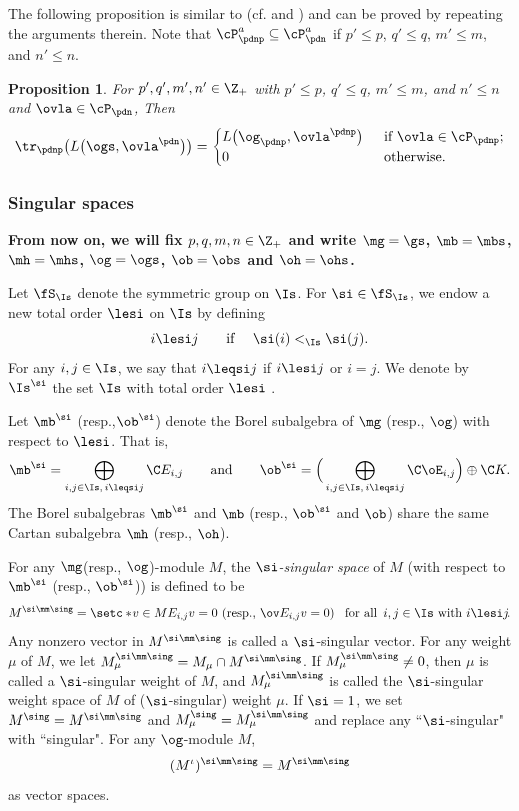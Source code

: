 \documentclass[11pt, reqno]{amsart}
\newtheorem{prop}[thm]{Proposition}
\theoremstyle{definition}
\theoremstyle{remark}
\numberwithin{equation}{section}
\begin{document}
The following proposition is similar to \cite[Lemma 3.2]{CLW11} (cf. \cite[Proposition 6.9]{CW} and \cite[Proposition 7.5]{CLW15}) and can be proved by repeating the arguments therein. Note that $\cP_\pdnp^a\subseteq \cP_\pdn^a$ if  $p' \le p$, $q' \le q$, $m' \le m$, and $n' \le n$.

\begin{prop}\label{trun-sep}
For $p', q', m', n' \in \Z_+$ with $p' \le p$, $q' \le q$, $m' \le m$, and $n' \le n$ and $\ovla \in \cP_\pdn$,
Then
$$
 \tr_\pdnp \big(L \big(\ogs, \ovla^\pdn \big)\big)
=\begin{cases}
     L \big(\og_\pdnp, \ovla^\pdnp \big) &\,\,\, \mbox{if $\ovla\in \cP_\pdnp$};\\
       0                                                   &\,\,\,  \mbox{otherwise}.
     \end{cases}
$$
\end{prop}


\subsubsection{Singular spaces}
 {\bf From now on, we will fix $p, q, m, n \in \Z_+$ and write $\mg=\gs$, $\mb=\mbs$, $\mh=\mhs$, $\og=\ogs$, $\ob=\obs$  and $\oh=\ohs$.}

Let $\fS_\Is$ denote the symmetric group on $\Is$.
For $\si \in  \fS_\Is$, we endow a new total order $\lesi$ on $\Is$ by defining
\begin{equation} \label{order}
i \lesi j \qquad \mbox{if $\quad \si(i)<_\Is \si(j)$.}
\end{equation}
For any $i, j \in \Is$, we say that $i \leqsi j$ if $i \lesi j$ or $i=j$.
We denote by $\Is^\si$ the set $\Is$ with total order $\lesi$ .

Let $\mb^{\si}$ (resp.,$\ob^{\si}$) denote the Borel subalgebra of $\mg$ (resp., $\og$) with respect to $\lesi$. That is,
$$
\mb^{\si}=\bigoplus_{\substack{ i,j \in \Is, \, i \leqsi j} }  \C E_{i, j}\qquad
\text{and} \qquad \ob^{\si}=\Big( \bigoplus_{\substack{ i,j \in \Is, \, i \leqsi j}} \C \oE_{i, j} \Big) \oplus \C K.
$$
The Borel subalgebras $\mb^{\si}$ and $\mb$ (resp., $\ob^{\si}$ and $\ob$) share the same Cartan subalgebra $\mh$ (resp., $\oh$).

For any $\mg$(resp., $\og$)-module $M$, the \emph{$\si$-singular space} of $M$ (with respect to $\mb^\si$ (resp., $\ob^\si$)) is defined to be
$$
M^{\si\mm\sing}=\setc*{\! v \in M }{E_{i, j} v=0 \,\,  \mbox{(resp., $\ov E_{i,j} v=0$) \, for all\, $i, j \in \Is $ with $i\lesi j$}\!}.
$$
Any nonzero vector in $M^{\si\mm\sing}$ is called a $\si$-singular vector.
For any weight $\mu$ of $M$, we let $M^{\si\mm\sing}_\mu=M_\mu \cap M^{\si\mm\sing}$.
If $M^{\si\mm\sing}_\mu \not=0$, then $\mu$ is called a $\si$-singular weight of $M$, and $M^{\si\mm\sing}_\mu$ is called the $\si$-singular weight space of $M$ of ($\si$-singular) weight $\mu$.
If $\si=1$, we set $M^\sing=M^{\si\mm\sing}$ and $M^\sing_\mu=M^{\si\mm\sing}_\mu$ and replace any ``$\si$-singular" with ``singular".
%
For any $\og$-module $M$,
$$
(M^\iota)^{\si\mm\sing}=M^{\si\mm\sing}
$$
as vector spaces.
\end{document}

